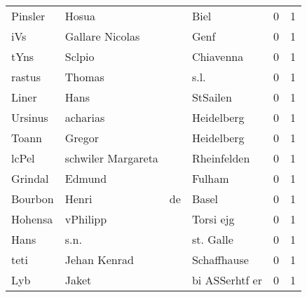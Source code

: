 \documentclass[10pt,a4paper,landscape]{article}
\begin{document}
\begin{longtable}{llllrr}
                  Pinsler &                              Hosua &             &                                        Biel &          0 &         1 \\
                      iVs &                    Gallare Nicolas &             &                                        Genf &          0 &         1 \\
                     tYns &                             Sclpio &             &                                   Chiavenna &          0 &         1 \\
                   rastus &                             Thomas &             &                                        s.l. &          0 &         1 \\
                    Liner &                               Hans &             &                                    StSailen &          0 &         1 \\
                  Ursinus &                           acharias &             &                                  Heidelberg &          0 &         1 \\
                    Toann &                             Gregor &             &                                  Heidelberg &          0 &         1 \\
                    lcPel &                 schwiler Margareta &             &                                 Rheinfelden &          0 &         1 \\
                  Grindal &                             Edmund &             &                                      Fulham &          0 &         1 \\
                  Bourbon &                              Henri &          de &                                       Basel &          0 &         1 \\
                  Hohensa &                           vPhilipp &             &                                   Torsi ejg &          0 &         1 \\
                     Hans &                               s.n. &             &                                   st. Galle &          0 &         1 \\
                     teti &                       Jehan Kenrad &             &                                 Schaffhause &          0 &         1 \\
                      Lyb &                              Jaket &             &                              bi ASSerhtf er &          0 &         1 \\

\end{longtable}
\end{document}
